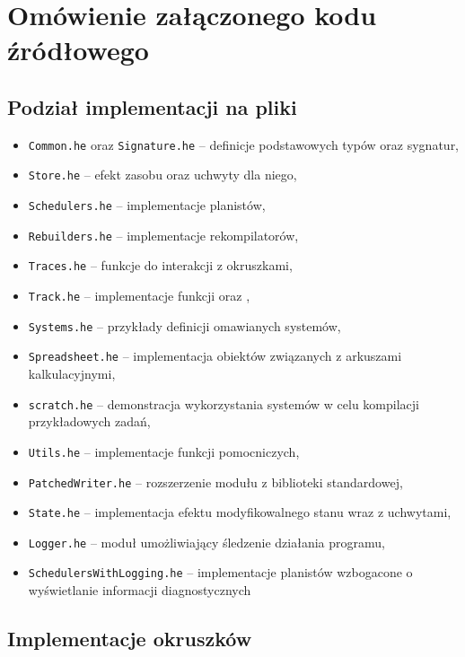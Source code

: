 
\newcommand{\file}[1]{\texttt{#1}}

\chapter{Omówienie załączonego kodu źródłowego}

\section{Podział implementacji na pliki}

\begin{itemize}
\item \file{Common.he} oraz \file{Signature.he} -- definicje podstawowych typów oraz sygnatur,
\item \file{Store.he} -- efekt zasobu oraz uchwyty dla niego,
\item \file{Schedulers.he} -- implementacje planistów,
\item \file{Rebuilders.he} -- implementacje rekompilatorów,
\item \file{Traces.he} -- funkcje do interakcji z okruszkami,
\item \file{Track.he} -- implementacje funkcji  oraz ,
\item \file{Systems.he} -- przykłady definicji omawianych systemów,
\item \file{Spreadsheet.he} -- implementacja obiektów związanych z arkuszami kalkulacyjnymi,
\item \file{scratch.he} -- demonstracja wykorzystania systemów w celu kompilacji przykładowych zadań,
\item \file{Utils.he} -- implementacje funkcji pomocniczych,
\item \file{PatchedWriter.he} -- rozszerzenie modułu  z biblioteki standardowej,
\item \file{State.he} -- implementacja efektu modyfikowalnego stanu wraz z uchwytami,
\item \file{Logger.he} -- moduł umożliwiający śledzenie działania programu,
\item \file{SchedulersWithLogging.he} -- implementacje planistów wzbogacone o wyświetlanie informacji diagnostycznych
\end{itemize}

\section{Implementacje okruszków}

